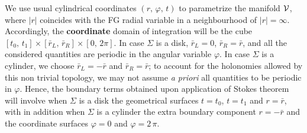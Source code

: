 \documentclass[a4paper,10pt]{article}
\begin{document}
We use usual cylindrical coordinates $(r,\, \varphi,\, t)$  
to parametrize the manifold $\cal V$, where $|r|$ coincides with the FG  
radial variable in a neighbourhood of $|r|=\infty$. 
Accordingly, the {\bf coordinate} 
domain of integration will be the cube $[t_0,\, t_1]\times 
[\bar r_L,\, \bar r_R]\times [0,\, 2\pi]$.  
In case $\Sigma$ is a disk, $\bar r_L = 0$, $\bar r_R = \bar r$,  
and all the considered quantities 
are periodic in the angular variable $\varphi$.  
In case $\Sigma$ is a cylinder, we choose  $\bar r_L =-\bar r$ and $\bar 
r_R=\bar r$;  
to account for the holonomies allowed by this non trivial 
topology, we may not assume {\it a priori} all quantities  
to be periodic in $\varphi$. Hence, the boundary terms obtained upon  
application of Stokes theorem will involve when $\Sigma$ is a disk  
the geometrical surfaces $t=t_0$, $t=t_1$ and $r=\bar r$, with in addition  
when $\Sigma$ is a cylinder the extra boundary  
component $r=- \bar r$ and the coordinate surfaces  
$\varphi=0$ and $\varphi=2 \, \pi$. 
 
\end{document}
